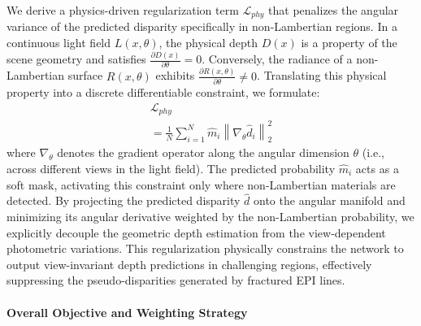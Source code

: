 \documentclass[lettersize,journal]{IEEEtran}
\begin{document}
We derive a physics-driven regularization term $\mathcal{L}_{phy}$ that penalizes the angular variance of the predicted disparity specifically in non-Lambertian regions. In a continuous light field $L(x, \theta)$, the physical depth $D(x)$ is a property of the scene geometry and satisfies $\frac{\partial D(x)}{\partial \theta} = 0$. Conversely, the radiance of a non-Lambertian surface $R(x, \theta)$ exhibits $\frac{\partial R(x, \theta)}{\partial \theta} \neq 0$. Translating this physical property into a discrete differentiable constraint, we formulate:
\begin{multline}

\mathcal{L}_{phy} \\
= \frac{1}{N} \sum_{i=1}^{N} \hat{m}_i \left\| \nabla_{\theta} \hat{d}_i \right\|_2^2
\end{multline}
where $\nabla_{\theta}$ denotes the gradient operator along the angular dimension $\theta$ (i.e., across different views in the light field). The predicted probability $\hat{m}_i$ acts as a soft mask, activating this constraint only where non-Lambertian materials are detected. By projecting the predicted disparity $\hat{d}$ onto the angular manifold and minimizing its angular derivative weighted by the non-Lambertian probability, we explicitly decouple the geometric depth estimation from the view-dependent photometric variations. This regularization physically constrains the network to output view-invariant depth predictions in challenging regions, effectively suppressing the pseudo-disparities generated by fractured EPI lines.

\paragraph{Overall Objective and Weighting Strategy}
\end{document}
